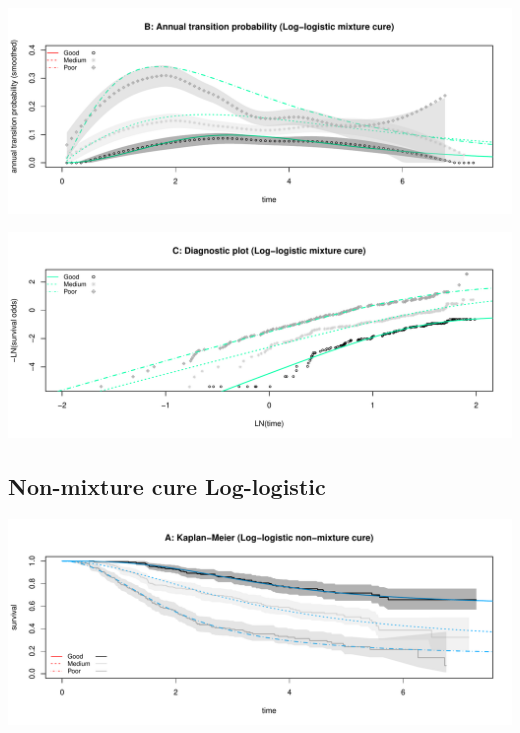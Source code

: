 \documentclass[
]{article}
\begin{document}
\begin{flushleft}\includegraphics[height=0.25\textheight]{Images/cure_llog_mix-2} \end{flushleft}

\begin{flushleft}\includegraphics[height=0.25\textheight]{Images/cure_llog_mix-3} \end{flushleft}

\clearpage

\hypertarget{non-mixture-cure-log-logistic}{%
\subsection{Non-mixture cure
Log-logistic}\label{non-mixture-cure-log-logistic}}

\begin{flushleft}\includegraphics[height=0.25\textheight]{Images/cure_llog_nmix-1} \end{flushleft}
\end{document}
